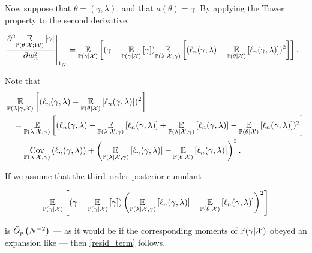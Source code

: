 Now suppose that $\theta = (\gamma, \lambda)$, and that $a(\theta) = \gamma$.  By applying
the Tower property to the second derivative,

$$
\begin{aligned}
    \left.\frac{\partial^2 \underset{\mathbb{P}(\theta | {\mathcal{X}}; \mathcal{W})}{\mathbb{E}}\left[\gamma\right]}{\partial w_n^2}\right\vert_{1_N}
={}&
\underset{\mathbb{P}(\gamma \vert {\mathcal{X}})}{\mathbb{E}}\left[
    (\gamma - \underset{\mathbb{P}(\gamma \vert {\mathcal{X}})}{\mathbb{E}}\left[\gamma\right])
    \underset{\mathbb{P}(\lambda \vert {\mathcal{X}}, \gamma)}{\mathbb{E}}\left[
        (\ell_n(\gamma, \lambda) - \underset{\mathbb{P}(\theta | {\mathcal{X}})}{\mathbb{E}}\left[\ell_n(\gamma, \lambda)\right])^2
    \right]
\right].
\end{aligned}
$$

Note that
%
$$
\begin{aligned}
\MoveEqLeft
    \expect{\p(\lambda \vert \gamma, \xvec)}{
        (\ell_n(\gamma, \lambda) - \expect{\post}{\ell_n(\gamma, \lambda)})^2
    }
\\={}&
\expect{\postl}{
    (\ell_n(\gamma, \lambda) -
    \expect{\postl}{\ell_n(\gamma, \lambda)} +
    \expect{\postl}{\ell_n(\gamma, \lambda)} -
    \expect{\post}{\ell_n(\gamma, \lambda)})^2
}
\\={}&
\cov{\postl}{\ell_n(\gamma, \lambda)} + 
\left(\expect{\postl}{\ell_n(\gamma, \lambda)} -  \expect{\post}{\ell_n(\gamma, \lambda)}\right)^2.
\end{aligned}
$$

If we assume that the third--order posterior cumulant

$$
\underset{\mathbb{P}(\gamma \vert {\mathcal{X}})}{\mathbb{E}}\left[
    (\gamma - \underset{\mathbb{P}(\gamma \vert {\mathcal{X}})}{\mathbb{E}}\left[\gamma\right])
    \left(\underset{\mathbb{P}(\lambda \vert {\mathcal{X}}, \gamma)}{\mathbb{E}}\left[\ell_n(\gamma, \lambda)\right] -  \underset{\mathbb{P}(\theta | {\mathcal{X}})}{\mathbb{E}}\left[\ell_n(\gamma, \lambda)\right]\right)^2
\right]
$$

is $\tilde{O}_p\left(N^{-2}\right)$ --- as it would be if the corresponding moments of $\mathbb{P}(\gamma \vert {\mathcal{X}})$ obeyed
an expansion like  --- then \eqref{resid_term} follows.